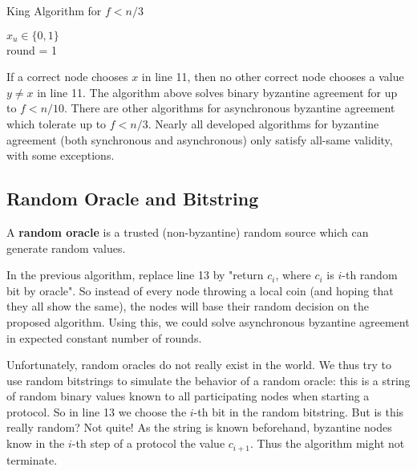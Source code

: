 \begin{algorithm}[H]
\caption{King Algorithm for $f < n / 3$}
	$x_u \in \{0,1\}$ \\
	round = 1
	
	\BlankLine
	
	
\end{algorithm}
\medskip

If a correct node chooses $x$ in line 11, then no other correct node chooses a value $y \neq x$ in line 11. The algorithm above solves binary byzantine agreement for up to $f < n/10$. There are other algorithms for asynchronous byzantine agreement which tolerate up to $f < n/3$. Nearly all developed algorithms for byzantine agreement (both synchronous and asynchronous) only satisfy all-same validity, with some exceptions.


\subsection{Random Oracle and Bitstring}

A \textbf{random oracle} is a trusted (non-byzantine) random source which can generate random values. \medskip

In the previous algorithm, replace line 13 by "return $c_i$, where $c_i$ is $i$-th random bit by oracle". So instead of every node throwing a local coin (and hoping that they all show the same), the nodes will base their random decision on the proposed algorithm. Using this, we could solve asynchronous byzantine agreement in expected constant number of rounds. \medskip

Unfortunately, random oracles do not really exist in the world. We thus try to use random bitstrings to simulate the behavior of a random oracle: this is a string of random binary values known to all participating nodes when starting a protocol. So in line 13 we choose the $i$-th bit in the random bitstring. But is this really random? Not quite! As the string is known beforehand, byzantine nodes know in the $i$-th step of a protocol the value $c_{i+1}$. Thus the algorithm might not terminate.
